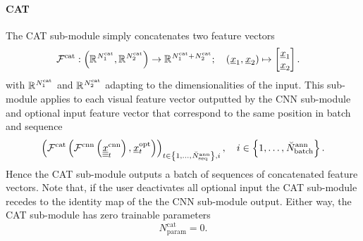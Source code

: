 \paragraph*{CAT} ${}$\\
The CAT sub-module simply concatenates
two feature vectors
\begin{align} \label{eq:cat}
    \mathcal{F}^\text{\cat}
    &:
    \left(
        \mathbb{R}^{\num[]{\cat}{1}{}{}},
        \mathbb{R}^{\num[]{\cat}{2}{}{}}
    \right)
    \rightarrow 
    \mathbb{R}^{
        \num[]{\cat}{1}{}{} + 
        \num[]{\cat}{2}{}{}
    }
    ;\quad
    \left(
        \featvec[]{}{1}{}{}, 
        \featvec[]{}{2}{}{}
    \right)
    \mapsto
    \begin{bmatrix}
        \featvec[]{}{1}{}{} \\ \featvec[]{}{2}{}{}
    \end{bmatrix}.
\end{align}
with
$\mathbb{R}^{\num[]{\cat}{1}{}{}}$
and
$\mathbb{R}^{\num[]{\cat}{2}{}{}}$
adapting to the dimensionalities of the input.
This sub-module applies to each
visual feature vector
outputted by the CNN sub-module 
and optional input feature vector
that correspond to the same position in batch and sequence
\begin{equation}
    \left(
        \mathcal{F}^\text{\cat} \left(
            \mathcal{F}^\text{cnn} \left(
                \img[]{\cnn}{t}{}{}
            \right),
            \featvec[]{\text{opt}}{t}{}{}
        \right)
    \right)_{
        t \in \left\{1, \dots, \num[\user]{\ann}{\seq}{}{}\right\}
        , i
    }
    , \quad 
    i \in \left\{1, \dots, \num[\user]{\ann}{\batch}{}{}\right\}.
\end{equation}
Hence the CAT sub-module outputs a batch of sequences
of concatenated feature vectors.
Note that, if the user deactivates all optional input
the CAT sub-module recedes to 
the identity map of the the CNN sub-module output.
Either way, 
the CAT sub-module has zero trainable parameters
\begin{equation}
    N^\text{cat}_\text{param} = 0.
\end{equation}


